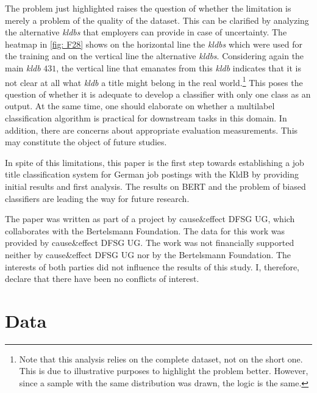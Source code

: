 \documentclass[12pt, a4paper, titlepage]{article}
\newenvironment{ConflictofInterest}{%
  \renewcommand*{\abstractname}{Conflict of Interest Statement} \abstract}{%
  \endabstract
}
\begin{document}
The problem just highlighted raises the question of whether the limitation is merely a problem of the quality of the dataset. This can be clarified by analyzing the alternative \textit{kldbs} that employers can provide in case of uncertainty. The heatmap in \ref{fig: F28} shows on the horizontal line the \textit{kldbs} which were used for the training and on the vertical line the alternative \textit{kldbs}. Considering again the main \textit{kldb} $431$, the vertical line that emanates from this \textit{kldb} indicates that it is not clear at all what \textit{kldb} a title might belong in the real world.\footnote{Note that this analysis relies on the complete dataset, not on the short one. This is due to illustrative purposes to highlight the problem better. However, since a sample with the same distribution was drawn, the logic is the same.} This poses the question of whether it is adequate to develop a classifier with only one class as an output. At the same time, one should elaborate on whether a multilabel classification algorithm is practical for downstream tasks in this domain. In addition, there are concerns about appropriate evaluation measurements. This may constitute the object of future studies.

In spite of this limitations, this paper is the first step towards establishing a job title classification system for German job postings with the \ac{KldB} by providing initial results and first analysis. The results on \ac{BERT} and the problem of biased classifiers are leading the way for future research.

\newpage

\begin{ConflictofInterest}
The paper was written as part of a project by cause\&effect DFSG UG, which collaborates with the Bertelsmann Foundation. The data for this work was provided by cause\&effect DFSG UG. The work was not financially supported neither by cause\&effect DFSG UG nor by the Bertelsmann Foundation. The interests of both parties did not influence the results of this study. I, therefore, declare that there have been no conflicts of interest.
\end{ConflictofInterest}

\newpage




\clearpage
{}
\renewcommand*{\thepage}
{A\arabic{page}}
\appendix
\section{Data}
\label{sec:A}
\end{document}
